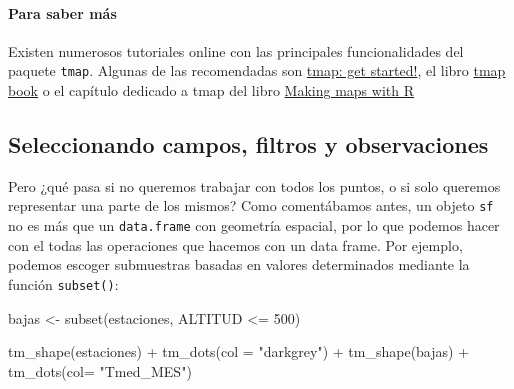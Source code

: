 \documentclass[
  letterpaper,
  DIV=11,
  numbers=noendperiod]{scrreprt}
\let\oldparagraph\paragraph
\renewcommand{\paragraph}[1]{\oldparagraph{#1}\mbox{}}
\newenvironment{Shaded}{\begin{snugshade}}{\end{snugshade}}
\newcommand{\AttributeTok}[1]{\textcolor[rgb]{0.40,0.45,0.13}{#1}}
\newcommand{\DecValTok}[1]{\textcolor[rgb]{0.68,0.00,0.00}{#1}}
\newcommand{\FunctionTok}[1]{\textcolor[rgb]{0.28,0.35,0.67}{#1}}
\newcommand{\NormalTok}[1]{\textcolor[rgb]{0.00,0.23,0.31}{#1}}
\newcommand{\OtherTok}[1]{\textcolor[rgb]{0.00,0.23,0.31}{#1}}
\newcommand{\SpecialCharTok}[1]{\textcolor[rgb]{0.37,0.37,0.37}{#1}}
\newcommand{\StringTok}[1]{\textcolor[rgb]{0.13,0.47,0.30}{#1}}
\begin{document}
\hypertarget{para-saber-muxe1s-2}{%
\paragraph{Para saber más}\label{para-saber-muxe1s-2}}

Existen numerosos tutoriales online con las principales funcionalidades
del paquete \texttt{tmap}. Algunas de las recomendadas son
\href{https://cran.r-project.org/web/packages/tmap/vignettes/tmap-getstarted.html}{tmap:
get started!}, el libro \href{https://r-tmap.github.io/tmap-book/}{tmap
book} o el capítulo dedicado a tmap del libro
\href{https://bookdown.org/nicohahn/making_maps_with_r5/docs/tmap.html}{Making
maps with R}

\hypertarget{seleccionando-campos-filtros-y-observaciones}{%
\subsection{Seleccionando campos, filtros y
observaciones}\label{seleccionando-campos-filtros-y-observaciones}}

Pero ¿qué pasa si no queremos trabajar con todos los puntos, o si solo
queremos representar una parte de los mismos? Como comentábamos antes,
un objeto \texttt{sf} no es más que un \texttt{data.frame} con geometría
espacial, por lo que podemos hacer con el todas las operaciones que
hacemos con un data frame. Por ejemplo, podemos escoger submuestras
basadas en valores determinados mediante la función \texttt{subset()}:

\begin{Shaded}
\begin{Highlighting}[]
\NormalTok{bajas }\OtherTok{\textless{}{-}} \FunctionTok{subset}\NormalTok{(estaciones, ALTITUD }\SpecialCharTok{\textless{}=} \DecValTok{500}\NormalTok{)}

\FunctionTok{tm\_shape}\NormalTok{(estaciones) }\SpecialCharTok{+}
    \FunctionTok{tm\_dots}\NormalTok{(}\AttributeTok{col =} \StringTok{"darkgrey"}\NormalTok{) }\SpecialCharTok{+}
\FunctionTok{tm\_shape}\NormalTok{(bajas) }\SpecialCharTok{+}
    \FunctionTok{tm\_dots}\NormalTok{(}\AttributeTok{col=} \StringTok{"Tmed\_MES"}\NormalTok{)}
\end{Highlighting}
\end{Shaded}
\end{document}
